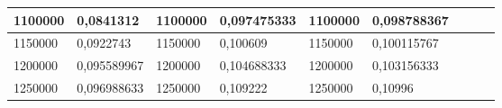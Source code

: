 \documentclass[11pt,openany]{book}
\begin{document}
\begin{table}[!ht]
\begin{tabular}{|l|l|l|l|l|l|l|l|}
        1100000                                           & 0,0841312                                          & 1100000                                             & 0,097475333                                         & 1100000         & 0,098788367     & ~               & ~               \\ \hline
        1150000                                           & 0,0922743                                          & 1150000                                             & 0,100609                                            & 1150000         & 0,100115767     & ~               & ~               \\ \hline
        1200000                                           & 0,095589967                                        & 1200000                                             & 0,104688333                                         & 1200000         & 0,103156333     & ~               & ~               \\ \hline
        1250000                                           & 0,096988633                                        & 1250000                                             & 0,109222                                            & 1250000         & 0,10996         & ~               &                 \\\hline
    \end{tabular}
\end{table}
\end{document}
